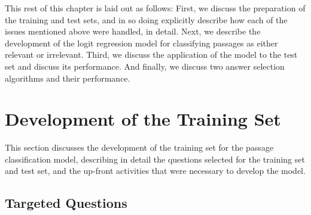 
This rest of this chapter is laid out as follows:  First, we discuss the preparation of the training and test sets, and in so doing explicitly describe how each of the issues mentioned above were handled, in detail.  Next, we describe the development of the logit regression model for classifying passages as either relevant or irrelevant.  Third, we discuss the application of the model to the test set and discuss its performance.  And finally, we discuss two answer selection algorithms and their performance.





\section{Development of the Training Set}

This section discusses the development of the training set for the passage classification model, describing in detail the questions selected for the training set and test set, and the up-front activities that were necessary to develop the model.


\subsection{Targeted Questions}


